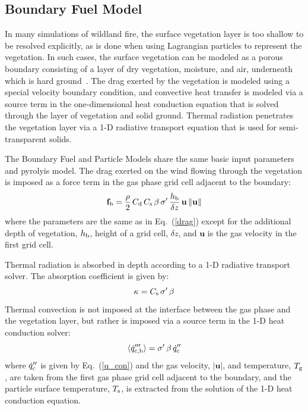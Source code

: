 \documentclass[journal,article,atmosphere,submit,moreauthors,pdftex]{Definitions/mdpi}
\begin{document}
\subsection{Boundary Fuel Model}

In many simulations of wildland fire, the surface vegetation layer is too shallow to be resolved explicitly, as is done when using Lagrangian particles to represent the vegetation. In such cases, the surface vegetation can be modeled as a porous boundary consisting of a layer of dry vegetation, moisture, and air, underneath which is hard ground~\cite{Mell:IJWF2007}. The drag exerted by the vegetation is modeled using a special velocity boundary condition, and convective heat transfer is modeled via a source term in the one-dimensional heat conduction equation that is solved through the layer of vegetation and solid ground. Thermal radiation penetrates the vegetation layer via a 1-D radiative transport equation that is used for semi-transparent solids.

The Boundary Fuel and Particle Models share the same basic input parameters and pyrolyis model. The drag exerted on the wind flowing through the vegetation is imposed as a force term in the gas phase grid cell adjacent to the boundary:
\begin{equation}
    \mathbf{f}_{\rm b} = \frac{\rho}{2} \, C_{\rm d} \, C_{\rm s} \, \beta \, \sigma' \, \frac{h_{\rm b}}{\delta z} \, \mathbf{u} \, \|\mathbf{u}\|
\end{equation}
where the parameters are the same as in Eq.~(\ref{drag}) except for the additional depth of vegetation, $h_{\rm b}$, height of a grid cell, $\delta z$, and $\mathbf{u}$ is the gas velocity in the first grid cell.

Thermal radiation is absorbed in depth according to a 1-D radiative transport solver. The absorption coefficient is given by:
\begin{equation}
   \kappa = C_{\rm s} \, \sigma' \, \beta
\end{equation}
Thermal convection is not imposed at the interface between the gas phase and the vegetation layer, but rather is imposed via a source term in the 1-D heat conduction solver:
\begin{equation}
   \langle \dot{q}_{\rm c,b}''' \rangle = \sigma' \, \beta \, \dot{q}_{\rm c}'' 
\end{equation}
where $\dot{q}_{\rm c}''$ is given by Eq.~(\ref{q_con}) and the gas velocity, $|\mathbf{u}|$, and temperature, $T_{\rm g}$, are taken from the first gas phase grid cell adjacent to the boundary, and the particle surface temperature, $T_{\rm s}$, is extracted from the solution of the 1-D heat conduction equation.
\end{document}
